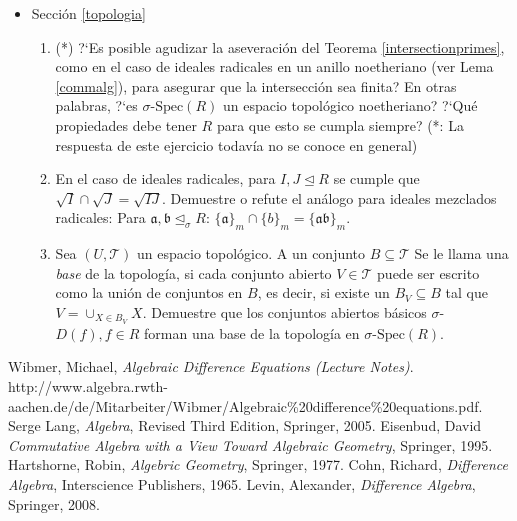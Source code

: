 \documentclass[letterpaper]{article}
\def\sSpec{\sigma\text{-Spec}}
\def\a{\mathfrak{a}}
\def\b{\mathfrak{b}}
\def\s{\sigma}
\def\si{\unlhd_{\sigma}}
\theoremstyle{definition}
\begin{document}
\begin{itemize}
\begin{enumerate}
\item Sea $(U,\mathcal{T})$ un espacio topol\'ogico con la topolog\'ia $\mathcal{T}$, y sea $x \in U$ un punto. Definimos el conjunto de entornos de $x$:
 \[ \mathcal{U}_x := \{ x \in F \subseteq U \mid \text{ existe un } V \in \mathcal{T}: V \subseteq F\} \]
Demuestre que $\mathcal{U}_x$ es un filtro.
  \end{enumerate}
\item Secci\'on \ref{topologia}
  \begin{enumerate}
\item (*) ?`Es posible agudizar la aseveraci\'on del Teorema \ref{intersectionprimes}, como en el caso de ideales radicales en un anillo noetheriano (ver Lema \ref{commalg}), 
para asegurar que la intersecci\'on sea finita? En otras palabras, ?`es $\sSpec(R)$ un espacio topol\'ogico noetheriano? ?`Qu\'e propiedades debe tener $R$ para que esto se cumpla siempre?
(*: La respuesta de este ejercicio todav\'ia no se conoce en general)
\item En el caso de ideales radicales, para $I,J \unlhd R$ se cumple que $\sqrt{I} \cap \sqrt{J} = \sqrt{IJ}$. Demuestre o refute el an\'alogo para ideales mezclados radicales:
Para $\a, \b \si R$: $\{\a\}_m \cap \{b\}_m = \{\a\b\}_m$.
\item Sea $(U,\mathcal{T})$ un espacio topol\'ogico. A un conjunto $B \subseteq \mathcal{T}$ Se le llama una \emph{base} de la topolog\'ia,
 si cada conjunto abierto $V \in \mathcal{T}$ puede ser escrito como la uni\'on de conjuntos en $B$, es decir, si existe un $B_V \subseteq B$ tal que $V = \cup_{X \in B_V} X$. 
 Demuestre que los conjuntos abiertos b\'asicos $\s$-$D(f), f \in R$ forman una base de la topolog\'ia en $\sSpec(R)$.
  \end{enumerate}

\end{itemize}


\begin{thebibliography}{9}
 Wibmer, Michael, \emph{Algebraic Difference Equations (Lecture Notes)}. http://www.algebra.rwth-aachen.de/de/Mitarbeiter/Wibmer/Algebraic\%20difference\%20equations.pdf.
 Serge Lang, \emph{Algebra}, Revised Third Edition, Springer, 2005.
 Eisenbud, David \emph{Commutative Algebra with a View Toward Algebraic Geometry}, Springer, 1995.
 Hartshorne, Robin, \emph{Algebric Geometry}, Springer, 1977.
 Cohn,  Richard, \emph{Difference Algebra}, Interscience Publishers, 1965.
 Levin, Alexander, \emph{Difference Algebra}, Springer, 2008.
\end{thebibliography}
\end{document}
